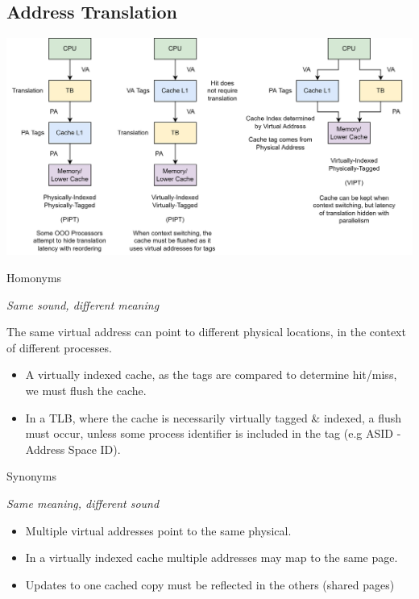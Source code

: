 \subsection{Address Translation}
\begin{center}
	\includegraphics[width=\textwidth]{caches/images/address_translation.drawio.png}
\end{center}
\begin{tcbraster}[raster columns=2,raster equal height]
	\begin{definitionbox}{Homonyms}
		\centerline{\textit{Same sound, different meaning}}
		The same virtual address can point to different physical locations, in the context of different processes.
		\begin{itemize}
			\item A virtually indexed cache, as the tags are compared to determine hit/miss, we must flush the cache.
			\item In a TLB, where the cache is necessarily virtually tagged \& indexed, a flush must occur, unless some process identifier is included in the tag (e.g ASID - Address Space ID).
		\end{itemize}
	\end{definitionbox}
	\begin{definitionbox}{Synonyms}
		\centerline{\textit{Same meaning, different sound}}
		\begin{itemize}
			\item Multiple virtual addresses point to the same physical.
			\item In a virtually indexed cache multiple addresses may map to the same page.
			\item Updates to one cached copy must be reflected in the others (shared pages)
		\end{itemize}
	\end{definitionbox}
\end{tcbraster}

